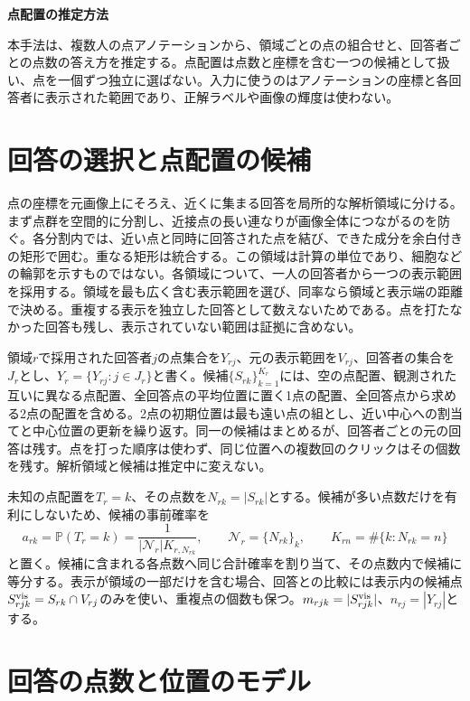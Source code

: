 \documentclass[a4paper,11pt]{article}
\newcommand{\Prob}{\mathbb{P}}
\begin{document}
\textbf{点配置の推定方法}

本手法は、複数人の点アノテーションから、領域ごとの点の組合せと、回答者ごとの点数の答え方を推定する。点配置は点数と座標を含む一つの候補として扱い、点を一個ずつ独立に選ばない。入力に使うのはアノテーションの座標と各回答者に表示された範囲であり、正解ラベルや画像の輝度は使わない。

\section*{回答の選択と点配置の候補}

点の座標を元画像上にそろえ、近くに集まる回答を局所的な解析領域に分ける。まず点群を空間的に分割し、近接点の長い連なりが画像全体につながるのを防ぐ。各分割内では、近い点と同時に回答された点を結び、できた成分を余白付きの矩形で囲む。重なる矩形は統合する。この領域は計算の単位であり、細胞などの輪郭を示すものではない。各領域について、一人の回答者から一つの表示範囲を採用する。領域を最も広く含む表示範囲を選び、同率なら領域と表示端の距離で決める。重複する表示を独立した回答として数えないためである。点を打たなかった回答も残し、表示されていない範囲は証拠に含めない。

領域$r$で採用された回答者$j$の点集合を$Y_{rj}$、元の表示範囲を$V_{rj}$、回答者の集合を$J_r$とし、$Y_r=\{Y_{rj}:j\in J_r\}$と書く。候補$\{S_{rk}\}_{k=1}^{K_r}$には、空の点配置、観測された互いに異なる点配置、全回答点の平均位置に置く1点の配置、全回答点から求める2点の配置を含める。2点の初期位置は最も遠い点の組とし、近い中心への割当てと中心位置の更新を繰り返す。同一の候補はまとめるが、回答者ごとの元の回答は残す。点を打った順序は使わず、同じ位置への複数回のクリックはその個数を残す。解析領域と候補は推定中に変えない。

未知の点配置を$T_r=k$、その点数を$N_{rk}=|S_{rk}|$とする。候補が多い点数だけを有利にしないため、候補の事前確率を
\begin{equation}
 a_{rk}=\Prob(T_r=k)=\frac{1}{|\mathcal N_r|K_{r,N_{rk}}},
 \qquad \mathcal N_r=\{N_{rk}\}_k,\qquad
 K_{rn}=\#\{k:N_{rk}=n\}
 \label{eq:prior-config}
\end{equation}
と置く。候補に含まれる各点数へ同じ合計確率を割り当て、その点数内で候補に等分する。表示が領域の一部だけを含む場合、回答との比較には表示内の候補点$S_{rjk}^{\rm vis}=S_{rk}\cap V_{rj}$のみを使い、重複点の個数も保つ。$m_{rjk}=|S_{rjk}^{\rm vis}|$、$n_{rj}=|Y_{rj}|$とする。

\section*{回答の点数と位置のモデル}
\end{document}
